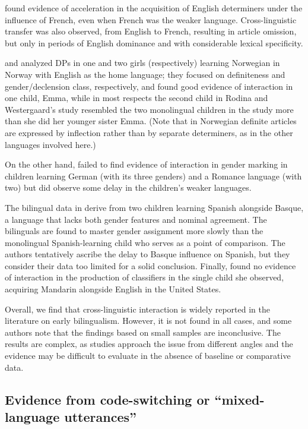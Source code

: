 \documentclass[output=paper]{langscibook}
\begin{document}
\citet{HervéSerratrice2018} found evidence of acceleration in the acquisition of English determiners under the influence of French, even when French was the weaker language. Cross-linguistic transfer was also observed, from English to French, resulting in article omission, but only in periods of English dominance and with considerable lexical specificity.   

\citet{AnderssenBentzen2013} and \citet{RodinaWestergaard2013} analyzed DPs in one and two girls (respectively) learning Norwegian in Norway with English as the home language; they focused on definiteness and gender/declension class, respectively, and found good evidence of interaction in one child, Emma, while in most respects the second child in Rodina and Westergaard’s study resembled the two monolingual children in the study more than she did her younger sister Emma. (Note that in Norwegian definite articles are expressed by inflection rather than by separate determiners, as in the other languages involved here.) 

On the other hand, \citet{EichlerEtAl2013} failed to find evidence of interaction in gender marking in children learning German (with its three genders) and a Romance language (with two) but did observe some delay in the children’s weaker languages. 

The bilingual data in \citet{LarrañagaGuijarro-Fuentes2013} derive from two children learning Spanish alongside Basque, a language that lacks both gender features and nominal agreement. The bilinguals are found to master gender assignment more slowly than the monolingual Spanish-learning child who serves as a point of comparison. The authors tentatively ascribe the delay to Basque influence on Spanish, but they consider their data too limited for a solid conclusion. Finally, \citet{Chang-Smith2010} found no evidence of interaction in the production of classifiers in the single child she observed, acquiring Mandarin alongside English in the United States.

Overall, we find that cross-linguistic interaction is widely reported in the literature on early bilingualism. However, it is not found in all cases, and some authors note that the findings based on small samples are inconclusive. The results are complex, as studies approach the issue from different angles and the evidence may be difficult to evaluate in the absence of baseline or comparative data.

\subsection{Evidence from code-switching or ``mixed-language utterances''} \label{sec:vihmannvihmann:3.2}
\end{document}
